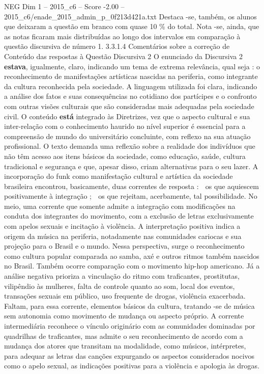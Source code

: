 \begin{textsample}{NEG Dim 1 – 2015\_c6 – Score -2.00 – 2015\_c6/enade\_2015\_admin\_p\_0f213d421a.txt}
Destaca -se, também, os alunos que deixaram a questão em branco com quase 10 \% do total.
Nota -se, ainda, que as notas ficaram mais distribuídas ao longo dos intervalos em comparação à questão discursiva de número 1. 3.3.1.4 Comentários sobre a correção de Conteúdo das respostas à Questão Discursiva 2 O enunciado da Discursiva 2 \textbf{estava}, igualmente, claro, indicando um tema de extrema relevância, qual seja : o reconhecimento de manifestações artísticas nascidas na periferia, como integrante da cultura reconhecida pela sociedade.
A linguagem utilizada foi clara, indicando a análise dos fatos e suas consequências no cotidiano dos partícipes e o confronto com outras visões culturais que são consideradas mais adequadas pela sociedade civil.
O conteúdo \textbf{está} integrado às Diretrizes, vez que o aspecto cultural e sua inter-relação com o conhecimento haurido no nível superior é essencial para a compreensão de mundo do universitário concluinte, com reflexo na sua atuação profissional.
O texto demanda uma reflexão sobre a realidade dos indivíduos que não têm acesso aos itens básicos da sociedade, como educação, saúde, cultura tradicional e segurança e que, apesar disso, criam alternativas para o seu lazer.
A incorporação do funk como manifestação cultural e artística da sociedade brasileira encontrou, basicamente, duas correntes de resposta :  os que aquiescem positivamente à integração ;  os que rejeitam, acerbamente, tal possibilidade.
No meio, uma corrente que somente admite a integração com modificações na conduta dos integrantes do movimento, com a exclusão de letras exclusivamente com apelos sexuais e incitação à violência.
A interpretação positiva indica a origem da música na periferia, notadamente nas comunidades cariocas e sua projeção para o Brasil e o mundo.
Nessa perspectiva, surge o reconhecimento como cultura popular comparada ao samba, axé e outros ritmos também nascidos no Brasil.
Também ocorre comparação com o movimento hip-hop americano.
Já a análise negativa prioriza a vinculação do ritmo com traficantes, prostitutas, vilipêndio às mulheres, falta de controle quanto ao som, local dos eventos, transações sexuais em público, uso frequente de drogas, violência exacerbada.
Faltam, para essa corrente, elementos básicos da cultura, tratando -se de música sem autonomia como movimento de mudança ou aspecto próprio.
A corrente intermediária reconhece o vínculo originário com as comunidades dominadas por quadrilhas de traficantes, mas admite o seu reconhecimento de acordo com a mudança dos atores que transitam na modalidade, como músicos, intérpretes, para adequar as letras das canções expurgando os aspectos considerados nocivos como o apelo sexual, as indicações positivas para a violência e apologia às drogas.

\end{textsample}
